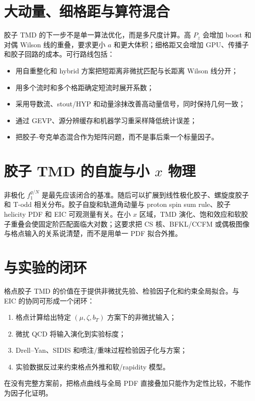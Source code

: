 \documentclass[UTF8,12pt,a4paper,twoside,openany]{ctexbook}
\newcommand{\fone}{f_{1}^{g/N}}
\begin{document}
\section{大动量、细格距与算符混合}

胶子 TMD 的下一步不是单一算法优化，而是多尺度计算。高 \(P_z\) 会增加 boost 和对偶 Wilson 线的重叠，要求更小 \(a\) 和更大体积；细格距又会增加 GPU、传播子和胶子回路的成本。可行路线包括：
\begin{itemize}
  \item 用自重整化和 hybrid 方案把短距离非微扰匹配与长距离 Wilson 线分开；
  \item 用多个流时和多个格距确定短流时展开系数；
  \item 采用导数流、stout/HYP 和动量涂抹改善高动量信号，同时保持几何一致；
  \item 通过 GEVP、源分辨缓存和机器学习重采样降低统计误差；
  \item 把胶子-夸克单态混合作为矩阵问题，而不是事后乘一个标量因子。
\end{itemize}

\section{胶子 TMD 的自旋与小 \texorpdfstring{\(x\)}{x} 物理}

非极化 \(\fone\) 是最先应该闭合的基准。随后可以扩展到线性极化胶子、螺旋度胶子和 T-odd 相关分布。胶子自旋和轨道角动量与 proton spin sum rule、胶子 helicity PDF 和 EIC 可观测量有关\cite{Egerer2022,JiReview2021}。在小 \(x\) 区域，TMD 演化、饱和效应和软胶子重叠会使固定阶匹配面临大对数；这要求把 CS 核、BFKL/CCFM 或偶极图像与格点输入的关系说清楚，而不是用单一 PDF 拟合外推。

\section{与实验的闭环}

格点胶子 TMD 的价值在于提供非微扰先验、检验因子化和约束全局拟合。与 EIC 的协同可形成一个闭环：
\begin{enumerate}
  \item 格点计算给出特定 \((\mu,\zeta,b_T)\) 方案下的非微扰输入；
  \item 微扰 QCD 将输入演化到实验标度；
  \item Drell--Yan、SIDIS 和喷注/重味过程检验因子化与方案；
  \item 实验数据反过来约束格点外推和软/rapidity 模型。
\end{enumerate}
在没有完整方案前，把格点曲线与全局 PDF 直接叠加只能作为定性比较，不能作为因子化证明。
\end{document}
